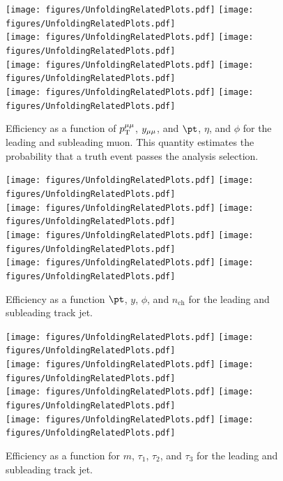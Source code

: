 \begin{figure}[h!]
  \centering
  \texttt{[image: figures/UnfoldingRelatedPlots.pdf]}
  \texttt{[image: figures/UnfoldingRelatedPlots.pdf]} \\
  \texttt{[image: figures/UnfoldingRelatedPlots.pdf]}
  \texttt{[image: figures/UnfoldingRelatedPlots.pdf]} \\
  \texttt{[image: figures/UnfoldingRelatedPlots.pdf]}
  \texttt{[image: figures/UnfoldingRelatedPlots.pdf]} \\
  \texttt{[image: figures/UnfoldingRelatedPlots.pdf]}
  \texttt{[image: figures/UnfoldingRelatedPlots.pdf]} \\
  \caption{Efficiency as a function of $p_\mathrm{T}^{\mu\mu}$, $y_{\mu\mu}$, and $\pt$, $\eta$, and $\phi$ for the leading and subleading muon. This quantity estimates the probability that a truth event passes the analysis selection.}
  \label{fig:EffDilep}
\end{figure}

\begin{figure}[h!]
  \centering
  \texttt{[image: figures/UnfoldingRelatedPlots.pdf]}
  \texttt{[image: figures/UnfoldingRelatedPlots.pdf]} \\
  \texttt{[image: figures/UnfoldingRelatedPlots.pdf]}
  \texttt{[image: figures/UnfoldingRelatedPlots.pdf]} \\
  \texttt{[image: figures/UnfoldingRelatedPlots.pdf]}
  \texttt{[image: figures/UnfoldingRelatedPlots.pdf]} \\
  \texttt{[image: figures/UnfoldingRelatedPlots.pdf]}
  \texttt{[image: figures/UnfoldingRelatedPlots.pdf]}
  \caption{Efficiency as a function $\pt$, $y$, $\phi$, and $n_{\text{ch}}$ for the leading and subleading track jet.}
  \label{fig:EffTJ1}
\end{figure}

\begin{figure}[h!]
  \centering
  \texttt{[image: figures/UnfoldingRelatedPlots.pdf]}
  \texttt{[image: figures/UnfoldingRelatedPlots.pdf]} \\
  \texttt{[image: figures/UnfoldingRelatedPlots.pdf]}
  \texttt{[image: figures/UnfoldingRelatedPlots.pdf]} \\
  \texttt{[image: figures/UnfoldingRelatedPlots.pdf]}
  \texttt{[image: figures/UnfoldingRelatedPlots.pdf]} \\
  \texttt{[image: figures/UnfoldingRelatedPlots.pdf]}
  \texttt{[image: figures/UnfoldingRelatedPlots.pdf]}
  \caption{Efficiency as a function for $m$, $\tau_1$, $\tau_2$, and $\tau_3$ for the leading and subleading track jet.}
  \label{fig:EffTJ2}
\end{figure}

